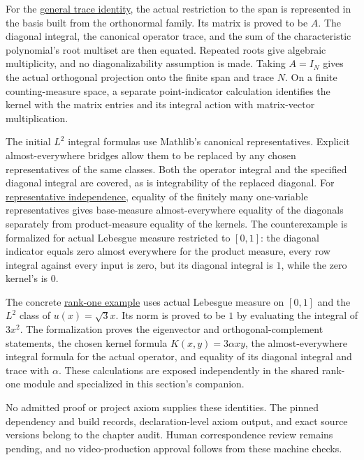 For the \hyperref[finite-kernel-trace-identity]{general trace identity}, the actual restriction to the span is represented in the basis built from the orthonormal family. Its matrix is proved to be $A$. The diagonal integral, the canonical operator trace, and the sum of the characteristic polynomial's root multiset are then equated. Repeated roots give algebraic multiplicity, and no diagonalizability assumption is made. Taking $A=I_N$ gives the actual orthogonal projection onto the finite span and trace $N$. On a finite counting-measure space, a separate point-indicator calculation identifies the kernel with the matrix entries and its integral action with matrix-vector multiplication.

The initial $L^2$ integral formulas use Mathlib's canonical representatives. Explicit almost-everywhere bridges allow them to be replaced by any chosen representatives of the same classes. Both the operator integral and the specified diagonal integral are covered, as is integrability of the replaced diagonal. For \hyperref[kernel-diagonal-representatives]{representative independence}, equality of the finitely many one-variable representatives gives base-measure almost-everywhere equality of the diagonals separately from product-measure equality of the kernels. The counterexample is formalized for actual Lebesgue measure restricted to $[0,1]$: the diagonal indicator equals zero almost everywhere for the product measure, every row integral against every input is zero, but its diagonal integral is $1$, while the zero kernel's is $0$.

The concrete \hyperref[finite-kernel-rank-one-example]{rank-one example} uses actual Lebesgue measure on $[0,1]$ and the $L^2$ class of $u(x)=\sqrt{3}x$. Its norm is proved to be $1$ by evaluating the integral of $3x^2$. The formalization proves the eigenvector and orthogonal-complement statements, the chosen kernel formula $K(x,y)=3\alpha xy$, the almost-everywhere integral formula for the actual operator, and equality of its diagonal integral and trace with $\alpha$. These calculations are exposed independently in the shared rank-one module and specialized in this section's companion.

No admitted proof or project axiom supplies these identities. The pinned dependency and build records, declaration-level axiom output, and exact source versions belong to the chapter audit. Human correspondence review remains pending, and no video-production approval follows from these machine checks.
